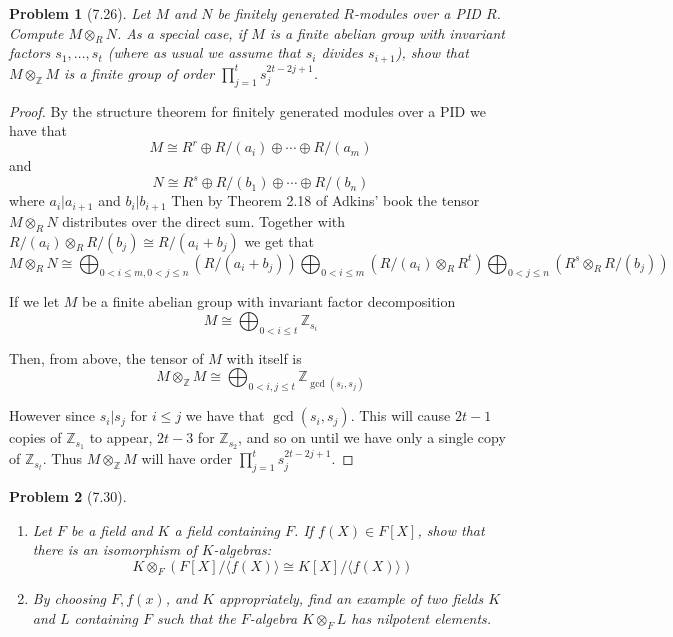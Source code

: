\documentclass[10pt]{article}
\newcommand{\sk}{\vskip 10mm}
\newcommand{\bb}[1]{\mathbb{#1}}
\theoremstyle{plain}
\newtheorem{problem}{Problem}
\theoremstyle{remark}
\begin{document}
\begin{problem}[7.26]
  Let $M$ and $N$ be finitely generated $R$-modules over a PID $R$. Compute
  $M\otimes_R N$. As a special case, if $M$ is a finite abelian group with
  invariant factors $s_1,\ldots,s_t$ (where as usual we assume that $s_i$
  divides $s_{i+1}$), show that $M\otimes_{\bb{Z}}M$ is a finite group of order
  $\prod_{j=1}^ts_j^{2t-2j+1}$.
\end{problem}

\begin{proof}
  By the structure theorem for finitely generated modules over a PID we
  have that
  \[
    M\cong R^r\oplus R/(a_i)\oplus\cdots \oplus R/(a_m)
  \]
  and
  \[
    N\cong R^s\oplus R/(b_1)\oplus \cdots \oplus R/(b_n)
  \]
  where $a_i|a_{i+1}$ and $b_i|b_{i+1}$
  Then by Theorem 2.18 of Adkins' book the tensor $M\otimes_R N$ distributes over
  the direct sum. Together with $R/(a_i)\otimes_R R/(b_j)\cong R/(a_i+b_j)$ we get that
  \[
    M\otimes_R N\cong \bigoplus_{0<i\leq m,0<j\leq n}\left(R/(a_i+b_j)\right)\bigoplus_{0<i\leq m}\left(R/(a_i)\otimes_R R^t\right)\bigoplus_{0<j\leq n}\left(R^s\otimes_R R/(b_j)\right)
  \]


  If we let $M$ be a finite abelian group with invariant factor decomposition
  \[
    M\cong \bigoplus_{0<i\leq t}\bb{Z}_{s_i}
  \]

  Then, from above, the tensor of $M$ with itself is
  \[
    M\otimes_{\bb{Z}} M \cong \bigoplus_{0<i,j\leq t}\bb{Z}_{\gcd(s_i,s_j)}
  \]

  However since $s_i|s_j$ for $i\leq j$ we have that $\gcd(s_i,s_j)$. This will
  cause $2t-1$ copies of $\bb{Z}_{s_1}$ to appear, $2t-3$ for $\bb{Z}_{s_2}$, and so on until
  we have only a single copy of $\bb{Z}_{s_t}$. Thus $M\otimes_{\bb{Z}}M$ will have
  order $\prod_{j=1}^ts_j^{2t-2j+1}$.
\end{proof}

\sk

\begin{problem}[7.30]
  \begin{enumerate}
  \item[(a)] Let $F$ be a field and $K$ a field containing $F$.
    If $f(X)\in F[X]$, show that there is an isomorphism of $K$-algebras:
    \[
      K\otimes_F(F[X]/\langle f(X)\rangle\cong K[X]/\langle f(X)\rangle)
    \]
  \item[(b)] By choosing $F, f(x)$, and $K$ appropriately, find an
    example of two fields $K$ and $L$ containing $F$ such that the
    $F$-algebra $K\otimes_F L$ has nilpotent elements.
  \end{enumerate}
\end{problem}
\end{document}
